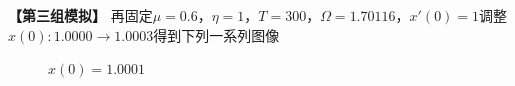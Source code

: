 \documentclass[dvipsnames, svgnames,a4paper,11pt]{article}
\begin{document}
\begin{question}
\textbf{【第三组模拟】}
再固定$\mu=0.6$，$\eta=1$，$T=300$，$\Omega=1.70116$，$x'(0)=1$调整$x(0):1.0000\to 1.0003$得到下列一系列图像
\begin{figure}[H]     
	\centering  %

	\caption{$x(0)=1.0001$}     
\end{figure}

\begin{figure}[H]     
	\centering  %


\end{figure}
\end{question}
\end{document}
